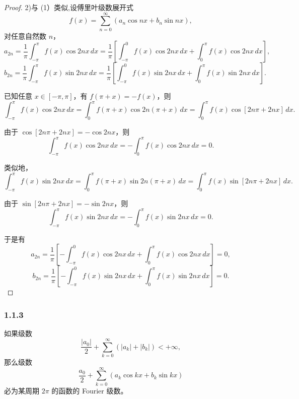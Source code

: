 \documentclass[12pt]{ctexart}
\begin{document}
\begin{proof}2)与 (1）类似,设傅里叶级数展开式
\[
f(x) = \sum_{n=0}^\infty \left(a_n \cos nx + b_n \sin nx\right),
\]
对任意自然数 $n$，
\[
a_{2n} = \frac{1}{\pi} \int_{-\pi}^\pi f(x) \cos 2nx \, dx
= \frac{1}{\pi} \left[ \int_{-\pi}^0 f(x) \cos 2nx \, dx + \int_0^\pi f(x) \cos 2nx \, dx \right],
\]
\[
b_{2n} = \frac{1}{\pi} \int_{-\pi}^\pi f(x) \sin 2nx \, dx
= \frac{1}{\pi} \left[ \int_{-\pi}^0 f(x) \sin 2nx \, dx + \int_0^\pi f(x) \sin 2nx \, dx \right].
\]

已知任意 $x \in [-\pi, \pi]$，有 $f(\pi + x) = -f(x)$，则
\[
\int_{-\pi}^\pi f(x) \cos 2nx \, dx = \int_0^\pi f(\pi + x) \cos 2n(\pi + x) \, dx
= \int_0^\pi f(x) \cos\left[2n\pi + 2nx\right] \, dx.
\]

由于 $\cos\left[2n\pi + 2nx\right] = -\cos 2nx$，则
\[
\int_{-\pi}^\pi f(x) \cos 2nx \, dx = -\int_0^\pi f(x) \cos 2nx \, dx = 0.
\]

类似地，
\[
\int_{-\pi}^\pi f(x) \sin 2nx \, dx = \int_0^\pi f(\pi + x) \sin 2n(\pi + x) \, dx
= \int_0^\pi f(x) \sin\left[2n\pi + 2nx\right] \, dx.
\]

由于 $\sin\left[2n\pi + 2nx\right] = -\sin 2nx$，则
\[
\int_{-\pi}^\pi f(x) \sin 2nx \, dx = -\int_0^\pi f(x) \sin 2nx \, dx = 0.
\]

于是有
\[
a_{2n} = \frac{1}{\pi} \left[ -\int_{-\pi}^0 f(x) \cos 2nx \, dx + \int_0^\pi f(x) \cos 2nx \, dx \right] = 0,
\]
\[
b_{2n} = \frac{1}{\pi} \left[ -\int_{-\pi}^0 f(x) \sin 2nx \, dx + \int_0^\pi f(x) \sin 2nx \, dx \right] = 0.
\]
\end{proof}

\subsubsection*{1.1.3}

如果级数
\[
\frac{|a_0|}{2} + \sum_{k=0}^\infty (|a_k| + |b_k|) < +\infty,
\]
那么级数
\[
\frac{a_0}{2} + \sum_{k=0}^\infty \left(a_k \cos kx + b_k \sin kx\right)
\]
必为某周期 $2\pi$ 的函数的 Fourier 级数。
\end{document}
